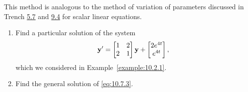 \documentclass{ximera}
\begin{document}
This method is analogous
to the method of variation of parameters discussed in
Trench \href{https://ximera.osu.edu/ode/main/variationOfParameters/variationOfParameters}{5.7} and \href{https://ximera.osu.edu/ode/main/varParHigherOrder/varParHigherOrder}{9.4} for scalar linear
equations.

\begin{example}\label{example:10.7.1} 
\begin{enumerate}
\item\label{item:10.7.1a} %
Find a particular solution of the system
\begin{equation} \label{eq:10.7.3}
{\bf y}'=\begin{bmatrix}1&2\\2&1\end{bmatrix}{\bf y}+\begin{bmatrix}2e^{4t}\\e^{4t}
\end{bmatrix},
\end{equation}
which we considered in Example~\ref{example:10.2.1}.
\item\label{item:10.7.1b} %
Find the general solution of  \eqref{eq:10.7.3}.
\end{enumerate}


\end{example}
\end{document}
